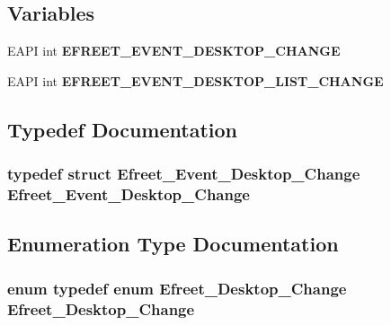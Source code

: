 \subsection*{Variables}
\begin{CompactItemize}
\item 
EAPI int {\bf EFREET\_\-EVENT\_\-DESKTOP\_\-CHANGE}
\item 
EAPI int {\bf EFREET\_\-EVENT\_\-DESKTOP\_\-LIST\_\-CHANGE}
\end{CompactItemize}


\subsection{Typedef Documentation}
\subsubsection{\setlength{\rightskip}{0pt plus 5cm}typedef struct {\bf Efreet\_\-Event\_\-Desktop\_\-Change} {\bf Efreet\_\-Event\_\-Desktop\_\-Change}}\label{efreet__utils_8h_dc0b2a76eebbeb6964214a6ace07b9c0}




\subsection{Enumeration Type Documentation}
\subsubsection{\setlength{\rightskip}{0pt plus 5cm}enum typedef enum {\bf Efreet\_\-Desktop\_\-Change} {\bf Efreet\_\-Desktop\_\-Change}}\label{efreet__utils_8h_4fe5a6524799731bb9fe6a406670b323}


